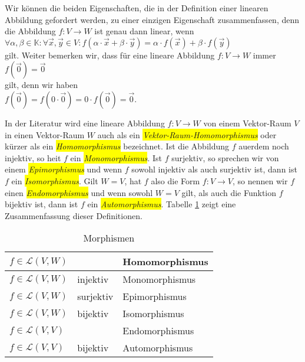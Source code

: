 \remark
Wir k\"{o}nnen die beiden Eigenschaften, die in der Definition einer linearen Abbildung gefordert werden, zu 
einer einzigen Eigenschaft zusammenfassen, denn die Abbildung $f:V \rightarrow W$ ist genau dann linear, wenn
\\[0.2cm]
\hspace*{1.3cm}
$\forall \alpha, \beta \in \mathbb{K}: \forall \vec{x}, \vec{y} \in V: f(\alpha \cdot \vec{x} + \beta \cdot \vec{y}) = \alpha \cdot f(\vec{x}) + \beta \cdot f(\vec{y})$
\\[0.2cm]
gilt.  Weiter bemerken wir, dass f\"{u}r eine lineare Abbildung $f:V \rightarrow W$ immer
\\[0.2cm]
\hspace*{1.3cm}
$f(\vec{0}) = \vec{0}$
\\[0.2cm]
gilt, denn wir haben
\\[0.2cm]
\hspace*{1.3cm}
$f(\vec{0}) = f(0 \cdot \vec{0}) = 0 \cdot f(\vec{0}) = \vec{0}$.
\eoxs

\remark
In der Literatur wird eine lineare Abbildung $f:V \rightarrow W$ von einem Vektor-Raum $V$ in einen
Vektor-Raum $W$ auch als ein \colorbox{yellow}{\emph{Vektor-Raum-Homomorphismus}} oder k\"{u}rzer als ein
\colorbox{yellow}{\emph{Homomorphismus}} bezeichnet.  Ist die Abbildung $f$ au\3erdem noch injektiv, so hei\3t $f$ ein
\colorbox{yellow}{\emph{Monomorphismus}}.  Ist $f$ surjektiv, so sprechen wir von einem \colorbox{yellow}{\emph{Epimorphismus}} und wenn
$f$ sowohl injektiv als auch surjektiv ist, dann ist $f$ ein \colorbox{yellow}{\emph{Isomorphismus}}.  Gilt $W = V$,
hat $f$ also die Form $f: V \rightarrow V$, so nennen wir $f$ einen \colorbox{yellow}{\emph{Endomorphismus}} und wenn
sowohl $W=V$ gilt, als auch die Funktion $f$ bijektiv ist, dann ist $f$ ein \colorbox{yellow}{\emph{Automorphismus}}. 
Tabelle \ref{tab:morphism} zeigt eine Zusammenfassung dieser Definitionen.


\begin{table}[h]
  \centering
  \begin{tabular}{||l|l|l||}
    \hline
    \hline
   $f \in \mathcal{L}(V,W)$ &           & Homomorphismus \\ 
    \hline
   $f \in \mathcal{L}(V,W)$ & injektiv  & Monomorphismus \\ 
    \hline
   $f \in \mathcal{L}(V,W)$ & surjektiv & Epimorphismus \\ 
    \hline
   $f \in \mathcal{L}(V,W)$ & bijektiv  & Isomorphismus \\ 
    \hline
   $f \in \mathcal{L}(V,V)$ &           & Endomorphismus \\ 
    \hline
   $f \in \mathcal{L}(V,V)$ & bijektiv  & Automorphismus \\ 
    \hline
    \hline
  \end{tabular}
  \caption{Morphismen}
  \label{tab:morphism}
\end{table}

